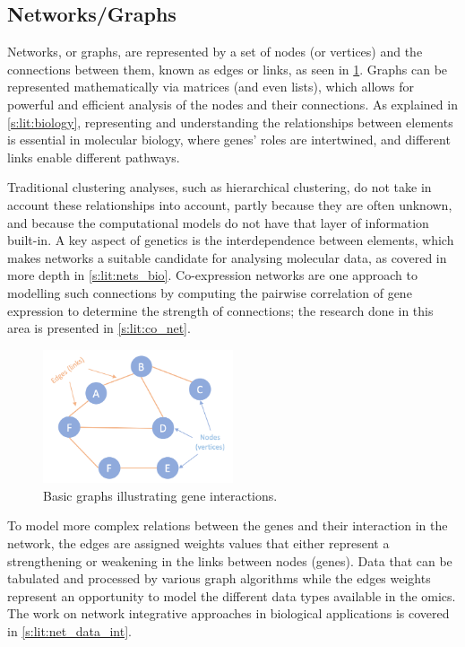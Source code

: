 \subsection{Networks/Graphs} \label{s:lit:graph_overview}

Networks, or graphs, are represented by a set of nodes (or vertices) and the connections between them, known as edges or links, as seen in \cref{fig:graphs_basic}. Graphs can be represented mathematically via matrices (and even lists), which allows for powerful and efficient analysis of the nodes and their connections. As explained in \cref{s:lit:biology}, representing and understanding the relationships between elements is essential in molecular biology, where genes' roles are intertwined, and different links enable different pathways.

Traditional clustering analyses, such as hierarchical clustering, do not take in account these relationships into account, partly because they are often unknown, and because the computational models do not have that layer of information built-in. A key aspect of genetics is the interdependence between elements, which makes networks a suitable candidate for analysing molecular data, as covered in more depth in \cref{s:lit:nets_bio}. Co-expression networks are one approach to modelling such connections by computing the pairwise correlation of gene expression to determine the strength of connections; the research done in this area is presented in \cref{s:lit:co_net}.

\begin{figure}[!htb]
  \centering\includegraphics[width=0.5\textwidth,height=0.5\textheight,keepaspectratio]{Sections/Lit_review/Resources/basic_graphs.png}
    \caption{Basic graphs illustrating gene interactions.}
    \label{fig:graphs_basic}
\end{figure}

To model more complex relations between the genes and their interaction in the network, the edges are assigned weights values that either represent a strengthening or weakening in the links between nodes (genes). Data that can be tabulated and processed by various graph algorithms while the edges weights represent an opportunity to model the different data types available in the omics. The work on network integrative approaches in biological applications is covered in \cref{s:lit:net_data_int}.

